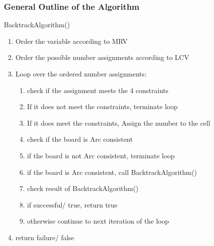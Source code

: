 \documentclass[12pt, a4paper]{article}
\begin{document}
			\subsubsection{General Outline of the Algorithm}
				BacktrackAlgorithm()
				\begin{enumerate}
					\item Order the variable according to MRV
					\item Order the possible number assignments according to LCV
					\item Loop over the ordered number assignments:
					\begin{enumerate}
						\item check if the assignment meets the 4 constraints
						\item If it does not meet the constraints, terminate loop
						\item If it does meet the constraints, Assign the number to the cell
						\item check if the board is Arc consistent
						\item if the board is not Arc consistent, terminate loop
						\item if the board is Arc consistent, call BacktrackAlgorithm()
						\item check result of BacktrackAlgorithm()
						\item if successful/ true, return true
						\item otherwise continue to next iteration of the loop
					\end{enumerate}
					\item return failure/ false
				\end{enumerate}
\end{document}
